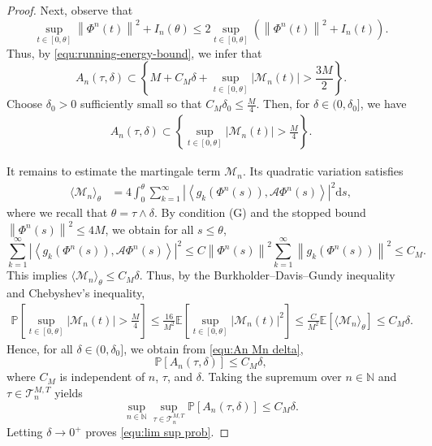 \documentclass[10pt,a4paper]{amsart}
\newcommand{\abs}[1]{\left|{#1}\right|}
\newcommand{\bb}{\mathbb}
\newcommand{\ds}{\mathrm{d}s}
\newcommand{\inpro}[2]{\left\langle#1,#2\right\rangle}
\newcommand{\norm}[1]{\left\|{#1}\right\|}
\begin{document}
\begin{proof}
	Next, observe that
	\[
	\sup_{t\in[0,\theta]}\norm{\Phi^n(t)}^2
	+
	I_n(\theta)
	\leq
	2\sup_{t\in[0,\theta]}
	\left(
	\norm{\Phi^n(t)}^2+I_n(t)
	\right).
	\]
	Thus, by \eqref{equ:running-energy-bound}, we infer that
	\[
	A_n(\tau,\delta)
	\subset
	\left\{
	M+C_M\delta
	+
	\sup_{t\in[0,\theta]}\abs{\mathcal M_n(t)}
	>
	\frac{3M}{2}
	\right\}.
	\]
	Choose $\delta_0>0$ sufficiently small so that $C_M\delta_0\leq \frac{M}{4}$.
	Then, for $\delta \in (0,\delta_0]$, we have
	\begin{align}\label{equ:An Mn delta}
	A_n(\tau,\delta)
	\subset
	\left\{
	\sup_{t\in[0,\theta]}\abs{\mathcal M_n(t)}
	>
	\frac{M}{4}
	\right\}.
	\end{align}
	
	It remains to estimate the martingale term $\mathcal{M}_n$. Its quadratic variation satisfies
	\begin{align*}
		\langle \mathcal M_n\rangle_\theta
		&=
		4\int_0^\theta
		\sum_{k=1}^\infty
		\abs{
			\inpro{g_k(\Phi^n(s))}{\mathcal A\Phi^n(s)}
		}^2
		\ds,
	\end{align*}
	where we recall that $\theta=\tau\wedge\delta$.
	By condition {\rm (G)} and the stopped bound $\norm{\Phi^n(s)}^2\leq 4M$, we obtain for all $s\leq\theta$,
	\[
	\sum_{k=1}^\infty
	\abs{
		\inpro{g_k(\Phi^n(s))}{\mathcal A\Phi^n(s)}
	}^2
	\leq
	C\norm{\Phi^n(s)}^2
	\sum_{k=1}^\infty \norm{g_k(\Phi^n(s))}^2
	\leq C_M.
	\]
	This implies $\langle \mathcal M_n\rangle_\theta
	\leq C_M\delta$.
	Thus, by the Burkholder--Davis--Gundy inequality and Chebyshev's inequality,
	\[
	\begin{aligned}
		\bb P\left[
		\sup_{t\in[0,\theta]}
		\abs{\mathcal M_n(t)}
		>
		\frac{M}{4}
		\right]
		\leq
		\frac{16}{M^2}
		\bb E\left[
		\sup_{t\in[0,\theta]}
		\abs{\mathcal M_n(t)}^2
		\right]
		\leq
		\frac{C}{M^2}
		\bb E\left[
		\langle\mathcal M_n\rangle_\theta
		\right]
		\leq
		C_M\delta .
	\end{aligned}
	\]
	Hence, for all $\delta\in (0,\delta_0]$, we obtain from \eqref{equ:An Mn delta},
	\[
	\bb P\left[A_n(\tau,\delta)\right]
	\leq C_M\delta,
	\]
	where $C_M$ is independent of $n$, $\tau$, and $\delta$. Taking the
	supremum over $n\in\bb N$ and $\tau\in\mathcal T_n^{M,T}$ yields
	\[
	\sup_{n\in\bb N}
	\sup_{\tau\in\mathcal T_n^{M,T}}
	\bb P\left[A_n(\tau,\delta)\right]
	\leq C_M\delta .
	\]
	Letting $\delta\to 0^+$ proves \eqref{equ:lim sup prob}.
\end{proof}
\end{document}
